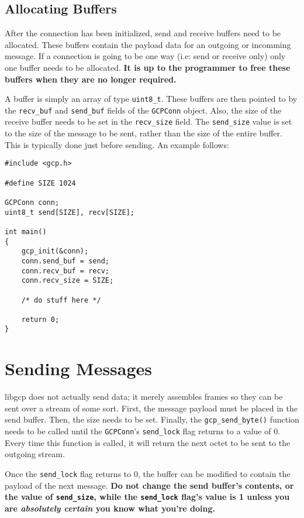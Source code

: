 \documentclass{article}
\begin{document}
\subsection{Allocating Buffers}
After the connection has been initialized, send and receive buffers
need to be allocated.  These buffers contain the payload data for an
outgoing or incomming message.  If a connection is going to be one way
(i.e: send or receive only) only one buffer needs to be allocated.
\textbf{It is up to the programmer to free these buffers when they are
  no longer required.}

A buffer is simply an array of type \texttt{uint8\_t}.  These buffers
are then pointed to by the \texttt{recv\_buf} and \texttt{send\_buf}
fields of the \texttt{GCPConn} object.  Also, the size of the receive
buffer needs to be set in the \texttt{recv\_size} field.  The
\texttt{send\_size} value is set to the size of the message to be
sent, rather than the size of the entire buffer.  This is typically
done just before sending.  An example follows:
\begin{verbatim}
#include <gcp.h>

#define SIZE 1024

GCPConn conn;
uint8_t send[SIZE], recv[SIZE];

int main()
{
    gcp_init(&conn);
    conn.send_buf = send;
    conn.recv_buf = recv;
    conn.recv_size = SIZE;

    /* do stuff here */

    return 0;
}
\end{verbatim}

\section{Sending Messages}
libgcp does not actually send data; it merely assembles frames so they
can be sent over a stream of some sort.  First, the message payload
must be placed in the send buffer.  Then, the size needs to be set.
Finally, the \texttt{gcp\_send\_byte()} function needs to be called
until the \texttt{GCPConn}'s \texttt{send\_lock} flag returns to a
value of 0.  Every time this function is called, it will return the
next octet to be sent to the outgoing stream.

Once the \texttt{send\_lock} flag returns to 0, the buffer can be
modified to contain the payload of the next message.  \textbf{Do not
  change the send buffer's contents, or the value of
  \texttt{send\_size}, while the \texttt{send\_lock} flag's value is 1
  unless you are \emph{absolutely certain} you know what you're
  doing.}
\end{document}
